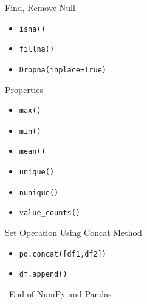 \documentclass[serif, aspectratio=169]{beamer}
\begin{document}
\begin{frame}{Find, Remove Null}
    \begin{itemize}
        \item \texttt{\color{red}isna()}
        \item \texttt{\color{red}fillna()}
        \item \texttt{\color{red}Dropna(inplace=True)}
    \end{itemize}
\end{frame}

\begin{frame}{Properties}
    \begin{itemize}
        \item \texttt{\color{red}max()}
        \item \texttt{\color{red}min()}
        \item \texttt{\color{red}mean()}
        \item \texttt{\color{red}unique()}
        \item \texttt{\color{red}nunique()}
        \item \texttt{\color{red}value\_counts()}
    \end{itemize}
\end{frame}

\begin{frame}{Set Operation Using Concat Method}
    \begin{itemize}
        \item \texttt{\color{red}pd.concat([df1,df2])}
        \item \texttt{\color{red}df.append()}
    \end{itemize}
\end{frame}

\begin{frame}
    \begin{center}
        {\Huge\ End of NumPy and Pandas}
    \end{center}
\end{frame}
\end{document}

